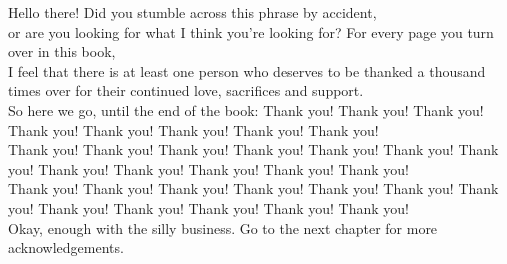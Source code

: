 























Hello there! Did you stumble across this phrase by accident,\\or are you looking for what I think you're looking for?
For every page you turn over in this book,\\I feel that there is at least one person who deserves to be thanked 
a thousand times over for their continued love, sacrifices and support.\\So here we go, until the end of the book: Thank you! Thank you!
Thank you! Thank you! Thank you! Thank you! Thank you! Thank you!\\Thank you! Thank you! Thank you! Thank you! Thank you! Thank you!
Thank you! Thank you! Thank you! Thank you! Thank you! Thank you!\\Thank you! Thank you! Thank you! Thank you! Thank you! Thank you!
Thank you! Thank you! Thank you! Thank you! Thank you! Thank you!\\Okay, enough with the silly business. 
Go to the next chapter for more acknowledgements.





















